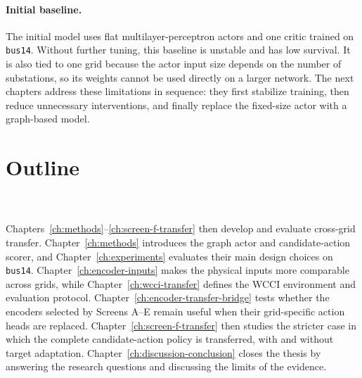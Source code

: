 \paragraph{Initial baseline.}
The initial model uses flat multilayer-perceptron actors and one critic trained
on \texttt{bus14}. Without further tuning, this baseline is unstable and has low
survival. It is also tied to one grid because the actor input size depends on
the number of substations, so its weights cannot be used directly on a larger
network. The next chapters address these limitations in sequence: they first
stabilize training, then reduce unnecessary interventions, and finally replace
the fixed-size actor with a graph-based model.

\section{Outline}
\label{sec:intro-outline}

\\
\\
{\color{red}Chapters~\ref{ch:methods}--\ref{ch:screen-f-transfer} then develop
and evaluate cross-grid transfer. Chapter~\ref{ch:methods} introduces the graph
actor and candidate-action scorer, and Chapter~\ref{ch:experiments} evaluates
their main design choices on \texttt{bus14}. Chapter~\ref{ch:encoder-inputs}
makes the physical inputs more comparable across grids, while
Chapter~\ref{ch:wcci-transfer} defines the WCCI environment and evaluation
protocol. Chapter~\ref{ch:encoder-transfer-bridge} tests whether the encoders
selected by Screens A--E remain useful when their grid-specific action heads
are replaced. Chapter~\ref{ch:screen-f-transfer} then studies the stricter case
in which the complete candidate-action policy is transferred, with and without
target adaptation. Chapter~\ref{ch:discussion-conclusion} closes the thesis by
answering the research questions and discussing the limits of the evidence.}
